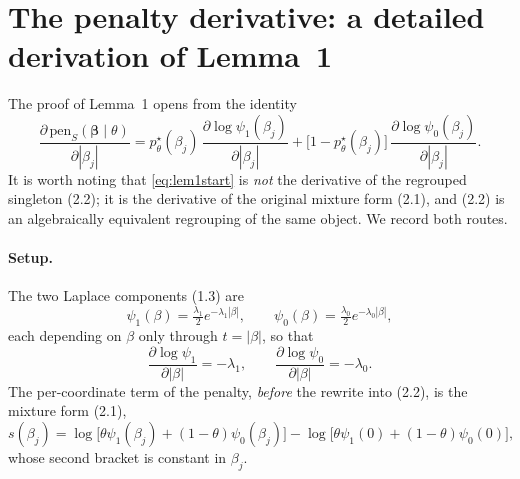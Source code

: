 \documentclass[11pt]{article}
\newcommand{\bbeta}{\bm{\beta}}
\newcommand{\pstar}{p^{\star}}
\begin{document}
\appendix

\section{The penalty derivative: a detailed derivation of Lemma~1}
\label{app:lemma1}

The proof of Lemma~1 opens from the identity
\begin{equation}\label{eq:lem1start}
  \frac{\partial\,\mathrm{pen}_S(\bbeta\mid\theta)}{\partial|\beta_j|}
  = \pstar_\theta(\beta_j)\,
      \frac{\partial\log\psi_1(\beta_j)}{\partial|\beta_j|}
  + \bigl[1-\pstar_\theta(\beta_j)\bigr]\,
      \frac{\partial\log\psi_0(\beta_j)}{\partial|\beta_j|}.
\end{equation}
It is worth noting that \eqref{eq:lem1start} is \emph{not} the derivative of the
regrouped singleton (2.2); it is the derivative of the original mixture form
(2.1), and (2.2) is an algebraically equivalent regrouping of the same object.
We record both routes.

\paragraph{Setup.}
The two Laplace components (1.3) are
\begin{equation*}
  \psi_1(\beta) = \tfrac{\lambda_1}{2}e^{-\lambda_1|\beta|},
  \qquad
  \psi_0(\beta) = \tfrac{\lambda_0}{2}e^{-\lambda_0|\beta|},
\end{equation*}
each depending on $\beta$ only through $t=|\beta|$, so that
\begin{equation}\label{eq:logscore}
  \frac{\partial\log\psi_1}{\partial|\beta|} = -\lambda_1,
  \qquad
  \frac{\partial\log\psi_0}{\partial|\beta|} = -\lambda_0.
\end{equation}
The per-coordinate term of the penalty, \emph{before} the rewrite into (2.2), is
the mixture form (2.1),
\begin{equation*}
  s(\beta_j) = \log\bigl[\theta\psi_1(\beta_j)+(1-\theta)\psi_0(\beta_j)\bigr]
             - \log\bigl[\theta\psi_1(0)+(1-\theta)\psi_0(0)\bigr],
\end{equation*}
whose second bracket is constant in $\beta_j$.
\end{document}
